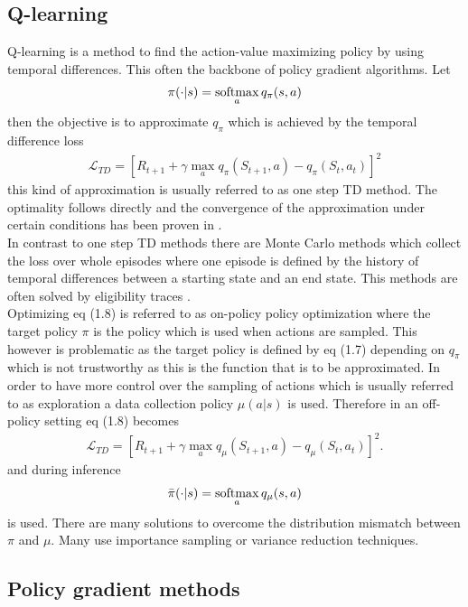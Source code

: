 \subsection{Q-learning}
Q-learning is a method to find the action-value maximizing policy by using temporal differences. This often the backbone of policy gradient algorithms. Let
\begin{align}
\pi(\cdot|s) = \operatorname*{softmax}_{a}q_{\pi}(s, a)
\end{align}
then the objective is to approximate $q_{\pi}$ which is achieved by the temporal difference loss
\begin{align}
\mathcal{L}_{TD} = \left[R_{t+1} + \gamma \max_{a}q_{\pi}(S_{t+1}, a) - q_{\pi}(S_t, a_t)\right]^2
\end{align}
this kind of approximation is usually referred to as one step TD method. The optimality follows directly and the convergence of the approximation under certain conditions has been proven in \cite{SBQL}.\\
In contrast to one step TD methods there are Monte Carlo methods which collect the loss over whole episodes where one episode is defined by the history of temporal differences between a starting state and an end state. This methods are often solved by eligibility traces \cite{SBeligibility}. \\
Optimizing eq (1.8) is referred to as on-policy policy optimization where the target policy $\pi$ is the policy which is used when actions are sampled. This however is problematic as the target policy is defined by eq (1.7) depending on $q_{\pi}$ which is not trustworthy as this is the function that is to be approximated. In order to have more control over the sampling of actions which is usually referred to as exploration a data collection policy $\mu(a|s)$ is used. Therefore in an off-policy setting eq (1.8) becomes
\begin{align}
\mathcal{L}_{TD} = \left[R_{t+1} + \gamma \max_{a}q_{\mu}(S_{t+1}, a) - q_{\mu}(S_t, a_t)\right]^2\text{.}
\end{align}
and during inference 
\begin{align}
\bar{\pi}(\cdot|s) = \operatorname*{softmax}_{a}q_{\mu}(s, a)
\end{align}
is used. There are many solutions to overcome the distribution mismatch between $\pi$ and $\mu$. Many use importance sampling or variance reduction techniques.\cite{liu2018breaking}

\subsection{Policy gradient methods}

